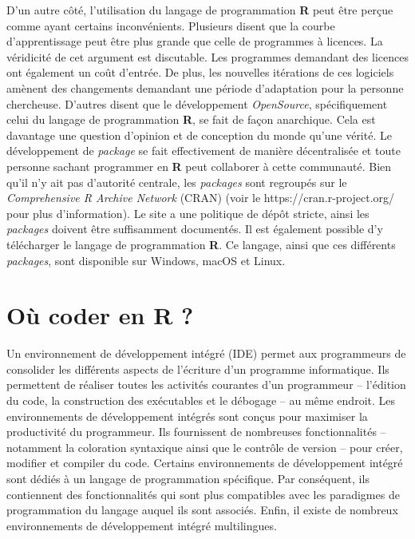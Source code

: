 \documentclass[
  letterpaper,
]{scrbook}
\begin{document}
D'un autre côté, l'utilisation du langage de programmation \textbf{R}
peut être perçue comme ayant certains inconvénients. Plusieurs disent
que la courbe d'apprentissage peut être plus grande que celle de
programmes à licences. La véridicité de cet argument est discutable. Les
programmes demandant des licences ont également un coût d'entrée. De
plus, les nouvelles itérations de ces logiciels amènent des changements
demandant une période d'adaptation pour la personne chercheuse. D'autres
disent que le développement \emph{OpenSource}, spécifiquement celui du
langage de programmation \textbf{R}, se fait de façon anarchique. Cela
est davantage une question d'opinion et de conception du monde qu'une
vérité. Le développement de \emph{package} se fait effectivement de
manière décentralisée et toute personne sachant programmer en \textbf{R}
peut collaborer à cette communauté. Bien qu'il n'y ait pas d'autorité
centrale, les \emph{packages} sont regroupés sur le \emph{Comprehensive
R Archive Network} (CRAN) (voir le https://cran.r-project.org/ pour plus
d'information). Le site a une politique de dépôt stricte, ainsi les
\emph{packages} doivent être suffisamment documentés. Il est également
possible d'y télécharger le langage de programmation \textbf{R}. Ce
langage, ainsi que ces différents \emph{packages}, sont disponible sur
Windows, macOS et Linux.

\hypertarget{ouxf9-coder-en-r}{%
\section{Où coder en R ?}\label{ouxf9-coder-en-r}}

Un environnement de développement intégré (IDE) permet aux programmeurs
de consolider les différents aspects de l'écriture d'un programme
informatique. Ils permettent de réaliser toutes les activités courantes
d'un programmeur -- l'édition du code, la construction des exécutables
et le débogage -- au même endroit. Les environnements de développement
intégrés sont conçus pour maximiser la productivité du programmeur. Ils
fournissent de nombreuses fonctionnalités -- notamment la coloration
syntaxique ainsi que le contrôle de version -- pour créer, modifier et
compiler du code. Certains environnements de développement intégré sont
dédiés à un langage de programmation spécifique. Par conséquent, ils
contiennent des fonctionnalités qui sont plus compatibles avec les
paradigmes de programmation du langage auquel ils sont associés. Enfin,
il existe de nombreux environnements de développement intégré
multilingues.
\end{document}
